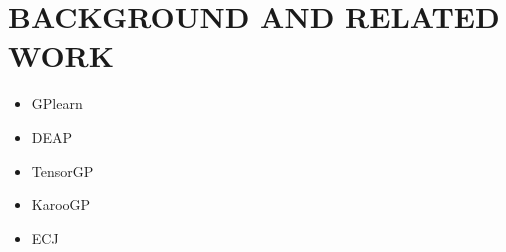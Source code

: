 \chapter{BACKGROUND AND RELATED WORK}
\label{chap:bgrw}
\begin{itemize}
    \item GPlearn
    \item DEAP
    \item TensorGP
    \item KarooGP
    \item ECJ
\end{itemize}